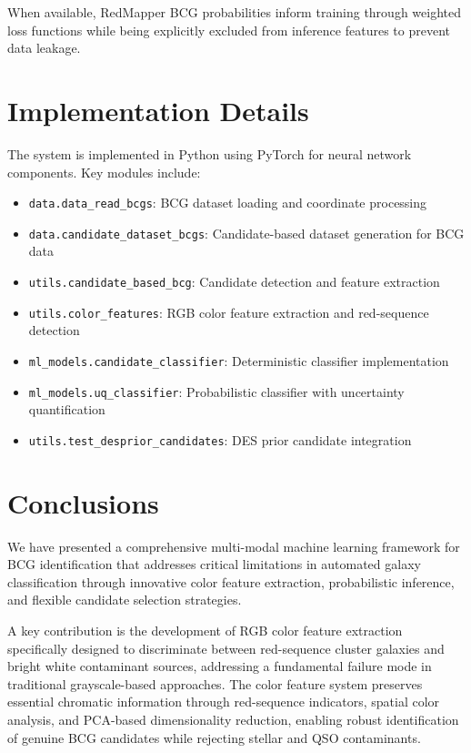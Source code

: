 \documentclass[twocolumn,10pt]{aastex631}
\begin{document}
When available, RedMapper BCG probabilities inform training through weighted loss functions while being explicitly excluded from inference features to prevent data leakage.

\section{Implementation Details}

The system is implemented in Python using PyTorch for neural network components. Key modules include:

\begin{itemize}
\item \texttt{data.data\_read\_bcgs}: BCG dataset loading and coordinate processing
\item \texttt{data.candidate\_dataset\_bcgs}: Candidate-based dataset generation for BCG data
\item \texttt{utils.candidate\_based\_bcg}: Candidate detection and feature extraction
\item \texttt{utils.color\_features}: RGB color feature extraction and red-sequence detection
\item \texttt{ml\_models.candidate\_classifier}: Deterministic classifier implementation
\item \texttt{ml\_models.uq\_classifier}: Probabilistic classifier with uncertainty quantification
\item \texttt{utils.test\_desprior\_candidates}: DES prior candidate integration
\end{itemize}

\section{Conclusions}

We have presented a comprehensive multi-modal machine learning framework for BCG identification that addresses critical limitations in automated galaxy classification through innovative color feature extraction, probabilistic inference, and flexible candidate selection strategies. 

A key contribution is the development of RGB color feature extraction specifically designed to discriminate between red-sequence cluster galaxies and bright white contaminant sources, addressing a fundamental failure mode in traditional grayscale-based approaches. The color feature system preserves essential chromatic information through red-sequence indicators, spatial color analysis, and PCA-based dimensionality reduction, enabling robust identification of genuine BCG candidates while rejecting stellar and QSO contaminants.
\end{document}
